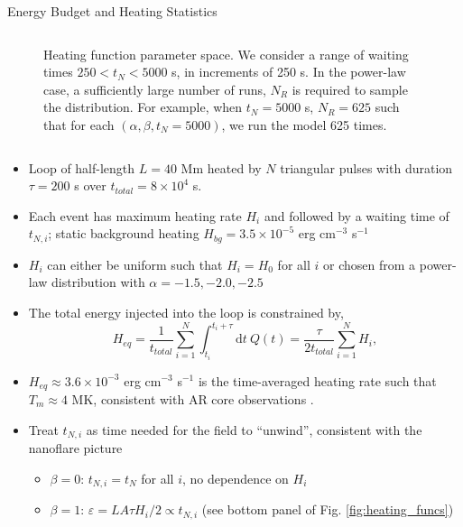 \documentclass[final]{beamer}
\begin{document}
\begin{frame}
\begin{columns}[T]
\begin{column}{0.49\linewidth}
\begin{block}{Energy Budget and Heating Statistics}
\begin{columns}[T]
      \begin{column}{0.49\columnwidth}
        \vspace{-6ex}
        \begin{figure}
          \centering
          
          \caption{Heating function parameter space. We consider a range of waiting times $250<t_N<5000$ s, in increments of 250 s. In the power-law case, a sufficiently large number of runs, $N_R$ is required to sample the distribution. For example, when $t_N=5000$ s, $N_R=625$ such that for each $(\alpha,\beta,t_N=5000)$, we run the model 625 times.}
          \label{fig:parameter_space}
        \end{figure}
        \vspace{-2ex}
      \end{column}
      \end{columns}
      \begin{itemize}
        \item Loop of half-length $L=40$ Mm heated by $N$ triangular pulses with duration $\tau=200$ s over $t_{total}=8\times10^4$ s.
        \item Each event has maximum heating rate $H_i$ and followed by a waiting time of $t_{N,i}$; static background heating $H_{bg}=3.5\times10^{-5}$ erg cm$^{-3}$ s$^{-1}$
        \item $H_i$ can either be uniform such that $H_i=H_0$ for all $i$ or chosen from a power-law distribution with $\alpha=-1.5,-2.0,-2.5$
        \item The total energy injected into the loop is constrained by,
          \begin{equation}
            H_{eq} = \frac{1}{t_{total}}\sum_{i=1}^N\int_{t_i}^{t_i+\tau}\mathrm{d}t~Q(t) = \frac{\tau}{2t_{total}}\sum_{i=1}^NH_i,
          \end{equation}
        \item $H_{eq}\approx3.6\times10^{-3}$ erg cm$^{-3}$ s$^{-1}$ is the time-averaged heating rate such that $T_{m}\approx4$ MK, consistent with AR core observations \citep{warren_systematic_2012}.
        \item Treat $t_{N,i}$ as time needed for the field to ``unwind'', consistent with the \citet{parker_nanoflares_1988} nanoflare picture
        \begin{itemize}
          \item $\beta=0$: $t_{N,i}=t_N$ for all $i$, no dependence on $H_i$
          \item $\beta=1$: $\varepsilon=LA\tau H_i/2\propto t_{N,i}$ (see bottom panel of Fig. \ref{fig:heating_funcs})

\end{itemize}
\end{itemize}
\end{block}
\end{column}
\end{columns}
\end{frame}
\end{document}
